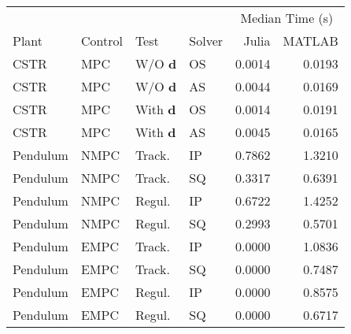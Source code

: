 \begin{tabular}{llllrr}
	
\toprule %

	  &	& & & \multicolumn{2}{c}{Median Time (s)} \\ \cmidrule(l){5-6}
Plant & Control & Test & Solver & Julia & MATLAB \\
\midrule %

CSTR		& MPC	& W/O $\mathbf{d}$	& OS & \num{0.0014} & \num{0.0193}	\\
CSTR		& MPC	& W/O $\mathbf{d}$	& AS & \num{0.0044} & \num{0.0169}	\\
CSTR		& MPC	& With $\mathbf{d}$ & OS & \num{0.0014} & \num{0.0191}	\\
CSTR		& MPC	& With $\mathbf{d}$ & AS & \num{0.0045} & \num{0.0165}	\\
Pendulum 	& NMPC	& Track. 	   		& IP & \num{0.7862} & \num{1.3210}	\\
Pendulum 	& NMPC	& Track. 	   		& SQ & \num{0.3317} & \num{0.6391}	\\
Pendulum    & NMPC	& Regul. 			& IP & \num{0.6722} & \num{1.4252} 	\\
Pendulum    & NMPC	& Regul. 			& SQ & \num{0.2993} & \num{0.5701} 	\\
Pendulum    & EMPC	& Track.			& IP & \num{0.0000} & \num{1.0836} 	\\
Pendulum    & EMPC	& Track.			& SQ & \num{0.0000} & \num{0.7487} 	\\
Pendulum	& EMPC	& Regul. 			& IP & \num{0.0000} & \num{0.8575} 	\\
Pendulum	& EMPC	& Regul. 			& SQ & \num{0.0000} & \num{0.6717}  \\
	
\bottomrule %
	
\end{tabular}